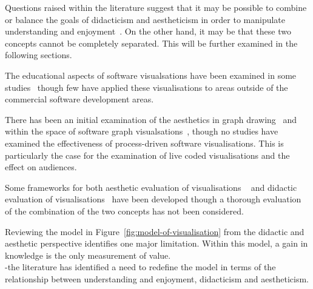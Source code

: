 Questions raised within the literature suggest that it may be possible to combine or balance the goals of didacticism and aestheticism in order to manipulate understanding and enjoyment~. On the other hand, it may be that these two concepts cannot be completely separated. This will be further examined in the following sections.

The educational aspects of software visualsations have been examined in some studies~ though few have applied these visualisations to areas outside of the commercial software development areas.

There has been an initial examination of the aesthetics in graph drawing~ and within the space of software graph visualsations~, though no studies have examined the effectiveness of process-driven software visualisations. This is particularly the case for the examination of live coded visualisations and the effect on audiences.

Some frameworks for both aesthetic evaluation of visualisations
~\cite{Cawthon2007,Purchase1996} and didactic evaluation of visualisations~\cite{VanWijk2005} have been developed though a thorough evaluation of the combination of the two concepts has not been considered.

Reviewing the model in Figure~\ref{fig:model-of-visualisation} from the didactic and aesthetic perspective identifies one major limitation. Within this model, a gain in knowledge is the only measurement of value.\\
-the literature has identified a need to redefine the model in terms of the relationship between understanding and enjoyment, didacticism and aestheticism.


